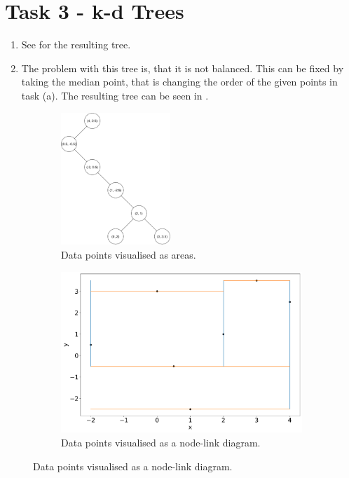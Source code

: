 \documentclass[a4paper]{article}
\begin{document}
\clearpage
\section*{Task 3 - k-d Trees}
\begin{enumerate}
	\item[(a)] See  for the resulting tree.
	
	\item[(b)] The problem with this tree is, that it is not balanced. 
	This can be fixed by taking the median point, that is changing the order of the given points in task (a). 
	The resulting tree can be seen in .
	
\end{enumerate}
\begin{figure}[!hb]
	\centering
	\begin{subfigure}[t]{.4\textwidth}
		\includegraphics[height=5cm]{2-dtree.pdf}
		\caption{Data points visualised as areas.}
		\label{1}
	\end{subfigure}
	\begin{subfigure}[t]{.4\textwidth}
		\includegraphics[width=\linewidth]{2dtree_nodelink.pdf}
		\caption{Data points visualised as a node-link diagram.}
		\label{2}

\end{subfigure}
\end{figure}
\end{document}
